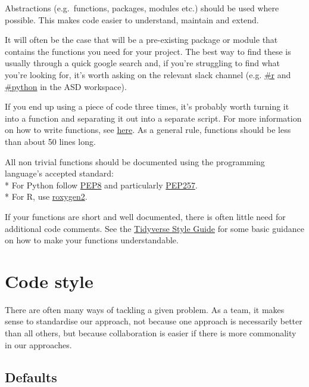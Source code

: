 \documentclass[]{book}
\begin{document}
Abstractions (e.g.~functions, packages, modules etc.) should be used where possible. This makes code easier to understand, maintain and extend.

It will often be the case that will be a pre-existing package or module that contains the functions you need for your project. The best way to find these is usually through a quick google search and, if you're struggling to find what you're looking for, it's worth asking on the relevant slack channel (e.g. \href{https://app.slack.com/client/T1PU1AP6D/C1PUCG719}{\#r} and \href{https://app.slack.com/client/T1PU1AP6D/C1Q09V86S}{\#python} in the ASD workspace).

If you end up using a piece of code three times, it's probably worth turning it into a function and separating it out into a separate script. For more information on how to write functions, see \href{https://github.com/moj-analytical-services/writing_functions_in_r}{here}. As a general rule, functions should be less than about 50 lines long.

All non trivial functions should be documented using the programming language's accepted standard:\\
* For Python follow \href{https://www.python.org/dev/peps/pep-0008/}{PEP8} and particularly \href{https://www.python.org/dev/peps/pep-0257/}{PEP257}.\\
* For R, use \href{https://cran.r-project.org/web/packages/roxygen2/vignettes/roxygen2.html}{roxygen2}.

If your functions are short and well documented, there is often little need for additional code comments. See the \href{https://style.tidyverse.org/functions.html\#naming}{Tidyverse Style Guide} for some basic guidance on how to make your functions understandable.

\hypertarget{style}{%
\section{Code style}\label{style}}

There are often many ways of tackling a given problem. As a team, it makes sense to standardise our approach, not because one approach is necessarily better than all others, but because collaboration is easier if there is more commonality in our approaches.

\hypertarget{defaults}{%
\subsection*{Defaults}\label{defaults}}
\end{document}
